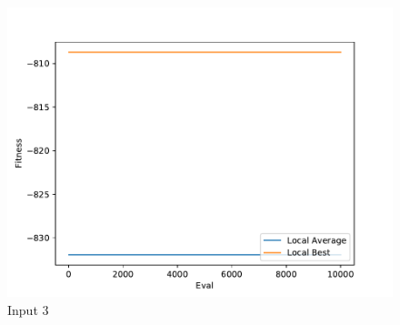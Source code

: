 \documentclass{standalone}
\begin{document}
\begin{figure}[!htb]
	\caption{Input 3}
	\label{fig:graph_3061}
	\includegraphics[width=\textwidth]{../graphs/graphs/3061.pdf}
\end{figure}
\end{document}
